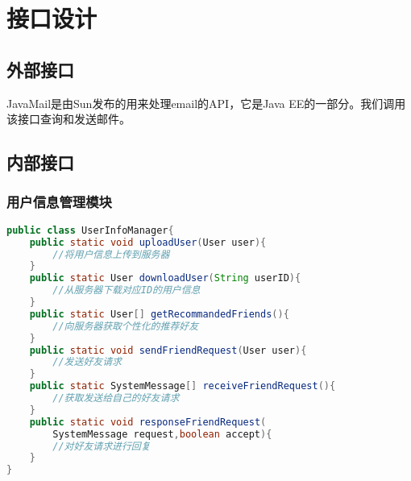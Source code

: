 \chapter{接口设计}
\section{外部接口}
JavaMail是由Sun发布的用来处理email的API，它是Java EE的一部分。我们调用该接口查询和发送邮件。

\section{内部接口}
\subsection{用户信息管理模块}
\begin{lstlisting}[language=Java, caption=用户信息管理模块接口]
public class UserInfoManager{
    public static void uploadUser(User user){
        //将用户信息上传到服务器
    }
    public static User downloadUser(String userID){
        //从服务器下载对应ID的用户信息
    }
    public static User[] getRecommandedFriends(){
        //向服务器获取个性化的推荐好友
    }
    public static void sendFriendRequest(User user){
        //发送好友请求
    }
    public static SystemMessage[] receiveFriendRequest(){
        //获取发送给自己的好友请求
    }
    public static void responseFriendRequest(
        SystemMessage request,boolean accept){
        //对好友请求进行回复
    }
}

\end{lstlisting}




